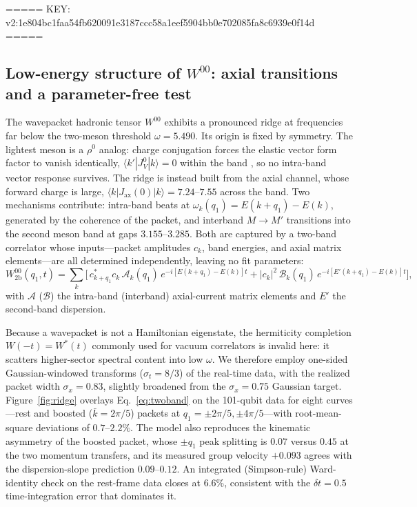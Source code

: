 ===== KEY: v2:1e804bc1faa54fb620091e3187ccc58a1eef5904bb0e702085fa8c6939e0f14d =====
\subsection{Low-energy structure of $W^{00}$: axial transitions and a parameter-free test}
\label{subsec:W00lowE}

The wavepacket hadronic tensor $W^{00}$ exhibits a pronounced ridge at frequencies far below the two-meson threshold $\omega=5.490$. Its origin is fixed by symmetry. The lightest meson is a $\rho^{0}$ analog: charge conjugation forces the elastic vector form factor to vanish identically, $\langle k'|J^{0}_{V}|k\rangle=0$ within the band \cite{placeholder}, so no intra-band vector response survives. The ridge is instead built from the axial channel, whose forward charge is large, $\langle k|J_{\mathrm{ax}}(0)|k\rangle=7.24\text{--}7.55$ across the band. Two mechanisms contribute: intra-band beats at $\omega_{k}(q_{1})=E(k{+}q_{1})-E(k)$, generated by the coherence of the packet, and interband $M\!\to\!M'$ transitions into the second meson band at gaps $3.155$--$3.285$. Both are captured by a two-band correlator whose inputs---packet amplitudes $c_{k}$, band energies, and axial matrix elements---are all determined independently, leaving no fit parameters:
\begin{equation}
W^{00}_{\mathrm{2b}}(q_{1},t)=\sum_{k}\Big[\,c^{*}_{k+q_{1}}c_{k}\,
\mathcal{A}_{k}(q_{1})\,e^{-i[E(k+q_{1})-E(k)]t}
+|c_{k}|^{2}\,\mathcal{B}_{k}(q_{1})\,e^{-i[E'(k+q_{1})-E(k)]t}\Big],
\label{eq:twoband}
\end{equation}
with $\mathcal{A}$ ($\mathcal{B}$) the intra-band (interband) axial-current matrix elements and $E'$ the second-band dispersion.

Because a wavepacket is not a Hamiltonian eigenstate, the hermiticity completion $W(-t)=W^{*}(t)$ commonly used for vacuum correlators is invalid here: it scatters higher-sector spectral content into low $\omega$. We therefore employ one-sided Gaussian-windowed transforms ($\sigma_{t}=8/3$) of the real-time data, with the realized packet width $\sigma_{x}=0.83$, slightly broadened from the $\sigma_{x}=0.75$ Gaussian target. Figure~\ref{fig:ridge} overlays Eq.~\eqref{eq:twoband} on the 101-qubit data for eight curves---rest and boosted ($\bar{k}=2\pi/5$) packets at $q_{1}=\pm2\pi/5,\pm4\pi/5$---with root-mean-square deviations of $0.7$--$2.2\%$. The model also reproduces the kinematic asymmetry of the boosted packet, whose $\pm q_{1}$ peak splitting is $0.07$ versus $0.45$ at the two momentum transfers, and its measured group velocity $+0.093$ agrees with the dispersion-slope prediction $0.09$--$0.12$. An integrated (Simpson-rule) Ward-identity check on the rest-frame data closes at $6.6\%$, consistent with the $\delta t=0.5$ time-integration error that dominates it.


